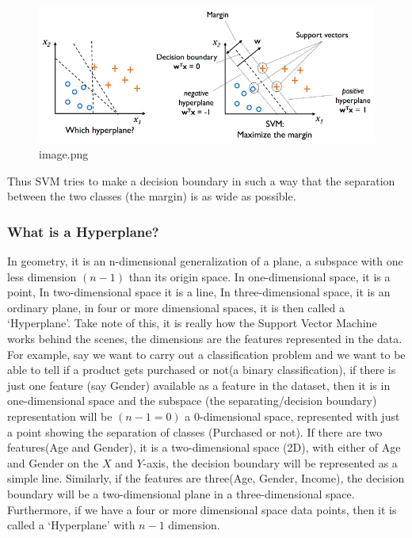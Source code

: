 \documentclass[11pt]{article}
\begin{document}
    \begin{figure}
\centering
\includegraphics{./pic/chapter-4-3_pic_0.png}
\caption{image.png}
\end{figure}

    Thus SVM tries to make a decision boundary in such a way that the
separation between the two classes (the margin) is as wide as possible.

    \hypertarget{what-is-a-hyperplane}{%
\subsubsection{What is a Hyperplane?}\label{what-is-a-hyperplane}}

In geometry, it is an n-dimensional generalization of a plane, a
subspace with one less dimension \((n-1)\) than its origin space. In
one-dimensional space, it is a point, In two-dimensional space it is a
line, In three-dimensional space, it is an ordinary plane, in four or
more dimensional spaces, it is then called a `Hyperplane'. Take note of
this, it is really how the Support Vector Machine works behind the
scenes, the dimensions are the features represented in the data. For
example, say we want to carry out a classification problem and we want
to be able to tell if a product gets purchased or not(a binary
classification), if there is just one feature (say Gender) available as
a feature in the dataset, then it is in one-dimensional space and the
subspace (the separating/decision boundary) representation will be
\((n-1=0)\) a 0-dimensional space, represented with just a point showing
the separation of classes (Purchased or not). If there are two
features(Age and Gender), it is a two-dimensional space (2D), with
either of Age and Gender on the \(X\) and \(Y\)-axis, the decision
boundary will be represented as a simple line. Similarly, if the
features are three(Age, Gender, Income), the decision boundary will be a
two-dimensional plane in a three-dimensional space. Furthermore, if we
have a four or more dimensional space data points, then it is called a
`Hyperplane' with \(n-1\) dimension.
\end{document}
